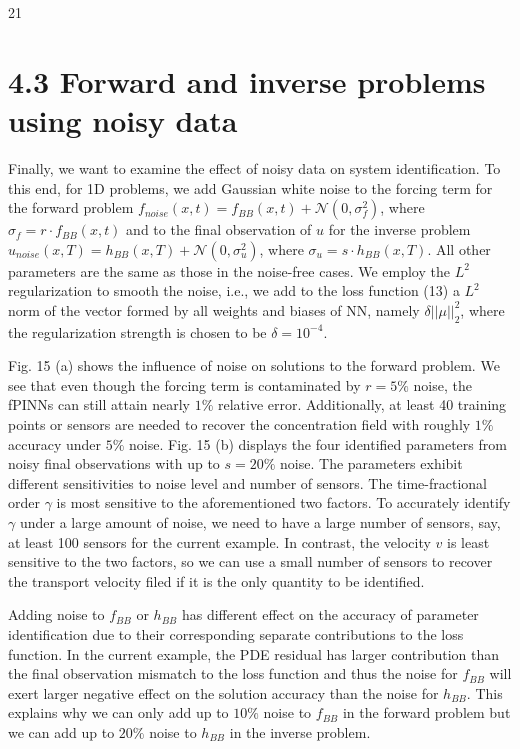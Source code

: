 \documentclass[UTF8]{article}
\begin{document}
21

\section{4.3 Forward and inverse problems using noisy data}

Finally, we want to examine the effect of noisy data on system identification. To this end, for 1D problems, we add Gaussian white noise to the forcing term for the forward problem $f_{noise}(x,t) = f_{BB}(x,t) + \mathcal{N}(0, \sigma_f^2)$, where $\sigma_f = r \cdot f_{BB}(x,t)$ and to the final observation of $u$ for the inverse problem $u_{noise}(x,T) = h_{BB}(x,T) + \mathcal{N}(0, \sigma_u^2)$, where $\sigma_u = s \cdot h_{BB}(x,T)$. All other parameters are the same as those in the noise-free cases. We employ the $L^2$ regularization to smooth the noise, i.e., we add to the loss function (13) a $L^2$ norm of the vector formed by all weights and biases of NN, namely $\delta ||\mu||_2^2$, where the regularization strength is chosen to be $\delta = 10^{-4}$.

Fig. 15 (a) shows the influence of noise on solutions to the forward problem. We see that even though the forcing term is contaminated by $r = 5\%$ noise, the fPINNs can still attain nearly $1\%$ relative error. Additionally, at least 40 training points or sensors are needed to recover the concentration field with roughly $1\%$ accuracy under $5\%$ noise. Fig. 15 (b) displays the four identified parameters from noisy final observations with up to $s = 20\%$ noise. The parameters exhibit different sensitivities to noise level and number of sensors. The time-fractional order $\gamma$ is most sensitive to the aforementioned two factors. To accurately identify $\gamma$ under a large amount of noise, we need to have a large number of sensors, say, at least 100 sensors for the current example. In contrast, the velocity $v$ is least sensitive to the two factors, so we can use a small number of sensors to recover the transport velocity filed if it is the only quantity to be identified.

Adding noise to $f_{BB}$ or $h_{BB}$ has different effect on the accuracy of parameter identification due to their corresponding separate contributions to the loss function. In the current example, the PDE residual has larger contribution than the final observation mismatch to the loss function and thus the noise for $f_{BB}$ will exert larger negative effect on the solution accuracy than the noise for $h_{BB}$. This explains why we can only add up to $10\%$ noise to $f_{BB}$ in the forward problem but we can add up to $20\%$ noise to $h_{BB}$ in the inverse problem.
\end{document}
